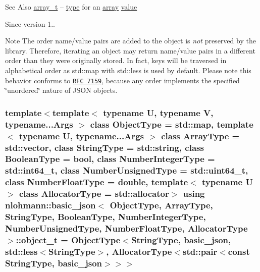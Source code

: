 \begin{DoxySeeAlso}{See Also}
\hyperlink{classnlohmann_1_1basic__json_ab00b882d39306d663c23dab110f5cae0}{array\-\_\-t} -- \hyperlink{classnlohmann_1_1basic__json_a5d466b240d0ba9f648d7fd4ff42359f5}{type} for an \hyperlink{classnlohmann_1_1basic__json_a5685815624b086caa532f41e853d4b0f}{array} \hyperlink{classnlohmann_1_1basic__json_a0a2cbbd95862a623e7dc5c37e67dead0}{value}
\end{DoxySeeAlso}
\begin{DoxySince}{Since}
version 1..
\end{DoxySince}
\begin{DoxyNote}{Note}
The order name/value pairs are added to the object is {\itshape not} preserved by the library. Therefore, iterating an object may return name/value pairs in a different order than they were originally stored. In fact, keys will be traversed in alphabetical order as {\ttfamily std\-::map} with {\ttfamily std\-::less} is used by default. Please note this behavior conforms to \href{http://rfc7159.net/rfc7159}{\tt R\-F\-C 7159}, because any order implements the specified \char`\"{}unordered\char`\"{} nature of J\-S\-O\-N objects. 
\end{DoxyNote}
\hypertarget{classnlohmann_1_1basic__json_a0ac9894c9de8dc551cf2e5f1c605537f}{
\subsubsection[{object\-\_\-t}]{\setlength{\rightskip}{0pt plus 5cm}template$<$template$<$ typename U, typename V, typename...\-Args $>$ class Object\-Type = std\-::map, template$<$ typename U, typename...\-Args $>$ class Array\-Type = std\-::vector, class String\-Type  = std\-::string, class Boolean\-Type  = bool, class Number\-Integer\-Type  = std\-::int64\-\_\-t, class Number\-Unsigned\-Type  = std\-::uint64\-\_\-t, class Number\-Float\-Type  = double, template$<$ typename U $>$ class Allocator\-Type = std\-::allocator$>$ using {\bf nlohmann\-::basic\-\_\-json}$<$ Object\-Type, Array\-Type, String\-Type, Boolean\-Type, Number\-Integer\-Type, Number\-Unsigned\-Type, Number\-Float\-Type, Allocator\-Type $>$\-::{\bf object\-\_\-t} =  Object\-Type$<$String\-Type, {\bf basic\-\_\-json}, std\-::less$<$String\-Type$>$, Allocator\-Type$<$std\-::pair$<$const String\-Type, {\bf basic\-\_\-json}$>$$>$$>$}}\label{classnlohmann_1_1basic__json_a0ac9894c9de8dc551cf2e5f1c605537f}


